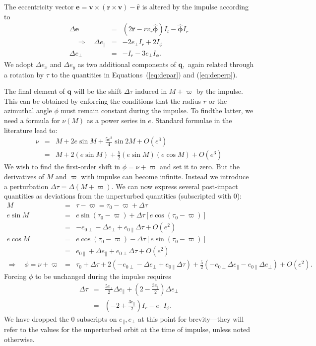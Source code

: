 \documentclass[linenumbers, onecolumn]{aastex631}
\newcommand{\vece}{\mathbf{e}}
\newcommand{\rhat}{\mathbf{\hat r}}
\newcommand{\phat}{\boldsymbol{\hat\phi}}
\newcommand{\vecq}{\mathbf{q}}
\newcommand{\vecr}{\mathbf{r}}
\newcommand{\vecv}{\mathbf{v}}
\newcommand{\lop}{\varpi}
\begin{document}
The eccentricity vector $\vece = \vecv \times (\vecr \times \vecv) - \rhat$ is altered by the impulse according to
\begin{eqnarray}
  \Delta\vece & = & (2\rhat - rv_r \phat) I_t - \phat I_r \\
\label{eq:depar}
  \quad \Rightarrow \quad \Delta e_\parallel & = &  -2e_\perp I_r + 2 I_\phi \\
\Delta e_\perp & = & -I_r - 3e_\perp I_\phi.
\label{eq:deperp}
\end{eqnarray}
We adopt $\Delta e_x$ and $\Delta e_y$ as two additional components of $\vecq,$ again related through a rotation by $\tau$ to the quantities in Equations~(\ref{eq:depar}) and (\ref{eq:deperp}).

The final element of $\vecq$ will be the shift $\Delta\tau$ induced in $M+\lop$ by the impulse.  This can be obtained by enforcing the conditions that the radius $r$ or the azimuthal angle $\phi$ must remain constant during the impulse.  To findthe latter, we need a formula for $\nu(M)$ as a power series in $e.$  Standard formulae in the literature lead to:
\begin{eqnarray}
  \nu & = & M + 2e \sin M + \frac{5e^2}{4} \sin 2M + O(e^3) \\
  \label{eq:nue2}
    & = & M + 2(e\sin M) + \frac{5}{2} (e \sin M) (e \cos M) + O(e^3) 
\end{eqnarray}
We wish to find the first-order shift in $\phi=\nu + \lop$ and set it to zero.  But the derivatives of $M$ and $\lop$ with impulse can become infinite.  Instead we introduce a perturbation $\Delta\tau = \Delta(M+\lop).$ We can now express several post-impact quantities as deviations from the unperturbed quantities (subscripted with 0):
\begin{eqnarray}
  M & = & \tau-\lop = \tau_0 -\lop + \Delta\tau \\
  e \sin M & = & e \sin (\tau_0 -\lop) + \Delta\tau \left[ e \cos  (\tau_0 -\lop)\right] \\
    & = & -e_{0\perp}-\Delta e_\perp + e_{0\parallel} \Delta\tau +O(e^2) \\
  e \cos M & = & e \cos (\tau_0 -\lop) - \Delta\tau \left[ e \sin  (\tau_0 -\lop)\right] \\
    & = & e_{0\parallel}+\Delta e_\parallel + e_{0\perp} \Delta\tau +O(e^2) \\
\Rightarrow \quad \phi =\nu+\lop & = & \tau_0 + \Delta \tau + 2( -e_{0\perp}-\Delta e_\perp + e_{0\parallel} \Delta\tau )
                              + \frac{5}{2}\left( -e_{0\perp}\Delta e_\parallel-e_{0\parallel}\Delta e_\perp\right) + O(e^2).
\end{eqnarray}
Forcing $\phi$ to be unchanged during the impulse requires
\begin{eqnarray}
  \Delta\tau & = & \frac{5 e_\perp}{2} \Delta e_\parallel + \left(2-\frac{3e_\parallel}{2}\right) \Delta e_\perp \\
             & = & \left(-2+\frac{3e_\parallel}{2}\right) I_r - e_\perp I_\phi.
                   \label{eq:dtau0}
\end{eqnarray}
We have dropped the 0 subscripts on $e_\parallel,e_\perp$ at this point for brevity---they will refer to the values for the unperturbed orbit at the time of impulse, unless noted otherwise.
\end{document}
